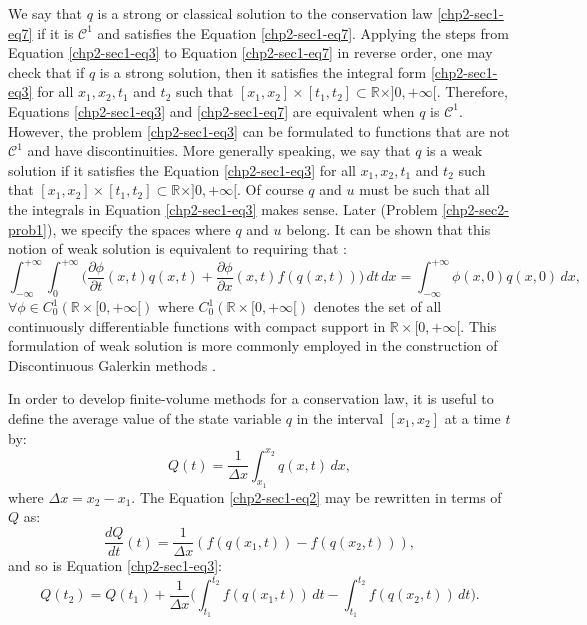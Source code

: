 We say that ${q}$ is a strong or classical solution to the conservation law \eqref{chp2-sec1-eq7}
if it is $\mathcal{C}^1$ and satisfies the Equation \eqref{chp2-sec1-eq7}.
Applying the steps from Equation \eqref{chp2-sec1-eq3} to Equation \eqref{chp2-sec1-eq7}
in reverse order, one may check that if ${q}$ is a strong solution,
then it satisfies the integral form \eqref{chp2-sec1-eq3} for all $x_1, x_2, t_1$ and $t_2$ such that
$[x_1, x_2] \times [t_1, t_2] \subset \mathbb{R}\times ]0, +\infty[$. 
Therefore, Equations \eqref{chp2-sec1-eq3} and \eqref{chp2-sec1-eq7} are
equivalent when ${q}$ is $\mathcal{C}^1$.
However, the problem \eqref{chp2-sec1-eq3} can be formulated
to functions that are not $\mathcal{C}^1$ and have discontinuities.
More generally speaking, we say that ${q}$ is a weak solution 
if it satisfies the Equation 
\eqref{chp2-sec1-eq3} for all $x_1, x_2, t_1$ and $t_2$ such that
$[x_1, x_2] \times [t_1, t_2] \subset \mathbb{R}\times ]0, +\infty[$.
Of course $q$ and $u$ must be such that all the integrals in Equation 
\eqref{chp2-sec1-eq3} makes sense. Later (Problem \ref {chp2-sec2-prob1}), we specify the spaces where $q$ and $u$ belong.
It can be shown that this notion of weak solution is equivalent to requiring that \citep{leveque:1990}:
\begin{equation}
	\label{chp2-sec1-eq8}
	\int_{-\infty}^{+\infty} \int_{0}^{+\infty} \bigg(
	\frac{\partial \phi}{\partial t} (x, t){q}(x, t) +
	\frac{\partial \phi}{\partial x} (x ,t){f}({q}(x, t)) 
	\bigg)\,dt \,dx = 
	\int_{-\infty}^{+\infty} \phi(x, 0){q}(x, 0) \,dx  , \quad
\end{equation}
$\forall \phi \in C_{0}^{1}(\mathbb{R}\times[0, +\infty[)$
where $C_{0}^{1}(\mathbb{R}\times[0, +\infty[)$ denotes the set
of all continuously differentiable functions with compact support 
in $\mathbb{R}\times[0, +\infty[$. This formulation of weak solution
is more commonly employed in the construction of Discontinuous Galerkin
methods \citep{nair:2011}.

In order to develop finite-volume methods for a conservation law, it is useful to define the
average value of the state variable ${q}$ in the interval $[x_1, x_2]$ at a time $t$ by:
\begin{equation}
	\label{chp2-sec1-eq9}
	{Q}(t) = \frac{1}{\Delta x}
	\int_{x_1}^{x_2} {q}(x,t) \,dx,
\end{equation}
where $\Delta x = x_2 - x_1$. The Equation \eqref{chp2-sec1-eq2} may be  rewritten in terms of ${Q}$ as:
\begin{equation}
        \label{chp2-sec1-eq10}
	\frac{dQ}{dt} (t) = \frac{1}{\Delta x} 
	({f}({q}(x_1,t)) - {f}({q}(x_2,t))) ,
\end{equation}
and so is Equation \eqref{chp2-sec1-eq3}:
\begin{equation}
        \label{chp2-sec1-eq11}
	{Q}(t_2) =  {Q}(t_1) + 
	\frac{1}{\Delta x}\bigg( \int_{t_1}^{t_2} 
	{f}({q}(x_1, t)) \,dt - 
	\int_{t_1}^{t_2}{f}({q}(x_2, t)) \,dt \bigg).
\end{equation}

